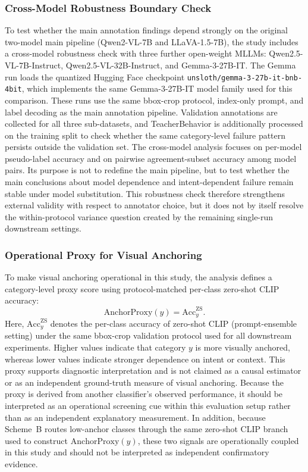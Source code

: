 \documentclass[10pt,letterpaper]{article}
\begin{document}
\subsubsection*{Cross-Model Robustness Boundary Check}

To test whether the main annotation findings depend strongly on the
original two-model main pipeline (Qwen2-VL-7B and LLaVA-1.5-7B), the study includes a
cross-model robustness check with three further open-weight MLLMs:
Qwen2.5-VL-7B-Instruct, Qwen2.5-VL-32B-Instruct, and Gemma-3-27B-IT.
The Gemma run loads the quantized Hugging Face checkpoint
\texttt{unsloth/gemma-3-27b-it-bnb-4bit}, which implements the same
Gemma-3-27B-IT model family used for this comparison.
These runs use the same bbox-crop protocol, index-only prompt, and
label decoding as the main annotation pipeline.
Validation annotations are collected for all three sub-datasets, and
TeacherBehavior is additionally processed on the training split to
check whether the same category-level failure pattern persists outside
the validation set.
The cross-model analysis focuses on per-model pseudo-label accuracy and
on pairwise agreement-subset accuracy among model pairs.
Its purpose is not to redefine the main pipeline, but to test whether
the main conclusions about model dependence and intent-dependent
failure remain stable under model substitution.
This robustness check therefore strengthens external validity with
respect to annotator choice, but it does not by itself resolve the
within-protocol variance question created by the remaining
single-run downstream settings.

\subsubsection*{Operational Proxy for Visual Anchoring}

To make visual anchoring operational in this study, the analysis
defines a category-level proxy score using protocol-matched per-class
zero-shot CLIP accuracy:
\[
\mathrm{AnchorProxy}(y)=\mathrm{Acc}^{\mathrm{ZS}}_{y}.
\]
Here, $\mathrm{Acc}^{\mathrm{ZS}}_{y}$ denotes the per-class accuracy of
zero-shot CLIP (prompt-ensemble setting) under the same bbox-crop
validation protocol used for all downstream experiments.
Higher values indicate that category $y$ is more visually anchored,
whereas lower values indicate stronger dependence on intent or context.
This proxy supports diagnostic interpretation and is not claimed as
a causal estimator or as an independent ground-truth measure of visual
anchoring.
Because the proxy is derived from another classifier's observed
performance, it should be interpreted as an operational screening cue
within this evaluation setup rather than as an independent explanatory
measurement.
In addition, because Scheme~B routes low-anchor classes through the
same zero-shot CLIP branch used to construct
$\mathrm{AnchorProxy}(y)$, these two signals are operationally
coupled in this study and should not be interpreted as independent
confirmatory evidence.
\end{document}
